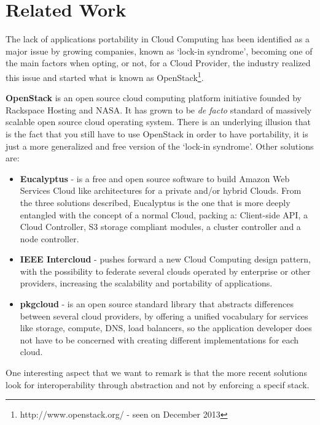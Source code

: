 
%
%

\section{Related Work}

The lack of applications portability in Cloud Computing has been identified as a major issue by growing companies, known as `lock-in syndrome', becoming one of the main factors when opting, or not, for a Cloud Provider, the industry realized this issue and started what is known as OpenStack\footnote{http://www.openstack.org/ - seen on December 2013}.

\textbf{OpenStack} is an open source cloud computing platform initiative founded by Rackspace Hosting and NASA. It has grown to be \textit{de facto} standard of massively scalable open source cloud operating system. There is an underlying illusion that is the fact that you still have to use OpenStack in order to have portability, it is just a more generalized and free version of the `lock-in syndrome'. Other solutions are:
\begin{itemize}
  \item \textbf{Eucalyptus} - is a free and open source software to build Amazon Web Services Cloud like architectures for a private and/or hybrid Clouds. From the three solutions described, Eucalyptus is the one that is more deeply entangled with the concept of a normal Cloud, packing a: Client-side API, a Cloud Controller, S3 storage compliant modules, a cluster controller and a node controller.
  \item \textbf{IEEE Intercloud} - pushes forward a new Cloud Computing design pattern, with the possibility to federate several clouds operated by enterprise or other providers, increasing the scalability and portability of applications.
  \item \textbf{pkgcloud} - is an open source standard library that abstracts differences between several cloud providers, by offering a unified vocabulary for services like storage, compute, DNS, load balancers, so the application developer does not have to be concerned with creating different implementations for each cloud.
\end{itemize}

One interesting aspect that we want to remark is that the more recent solutions look for interoperability through abstraction and not by enforcing a specif stack.

